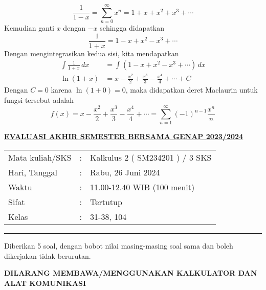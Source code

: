 \documentclass[11pt,openany,a4paper]{article}
\begin{document}
\begin{enumerate}
        \[
            \frac{1}{1-x} = \sum_{n=0}^{\infty} x^n =1 + x + x^2 + x^3 + \cdots
        \]
        Kemudian ganti \( x \) dengan \( -x \) sehingga didapatkan
        \[
            \frac{1}{1+x} =1 - x + x^2 - x^3 + \cdots
        \]
        Dengan mengintegrasikan kedua sisi, kita mendapatkan
        \begin{align*}
            \int \frac{1}{1+x} \, dx &= \int (1 - x + x^2 - x^3 + \cdots) \, dx \\
            \ln(1+x) &= x - \frac{x^2}{2} + \frac{x^3}{3} - \frac{x^4}{4} + \cdots + C
        \end{align*}
        Dengan \( C = 0 \) karena \( \ln(1+0) = 0 \), maka didapatkan deret Maclaurin untuk fungsi tersebut adalah
        \[
            f(x) = x - \frac{x^2}{2} + \frac{x^3}{3} - \frac{x^4}{4} + \cdots= \boxed{\sum_{n=1}^{\infty} (-1)^{n-1} \frac{x^n}{n}}
        \]

    \end{enumerate}

    \newpage
    \pagestyle{problems}
    
    \begin{center}
	{\underline{\textbf{\MakeUppercase{Evaluasi Akhir Semester Bersama Genap 2023/2024}}}}
    \end{center}

    \begin{center}
	\begin{tabular}{lcl}
		Mata kuliah/SKS & : & Kalkulus 2 ( SM234201 ) / 3 SKS\\
		Hari, Tanggal & : & Rabu, 26 Juni 2024\\
		Waktu & : & 11.00-12.40 WIB (100 menit)\\
		Sifat & : & Tertutup\\
		Kelas & : & 31-38, 104
	\end{tabular}
    \end{center}
	
    \noindent\rule{\textwidth}{2.pt}
	
    \setlength{\parindent}{5pt}
    \par Diberikan 5 soal, dengan bobot nilai masing-masing soal sama dan boleh dikerjakan tidak berurutan.
    \setlength{\parindent}{5pt}
    \setlength{\parindent}{5pt}
    {\small
    \par \textbf{\MakeUppercase{Dilarang membawa/menggunakan kalkulator dan alat komunikasi}}
    }
    \par {}
	
\end{document}
